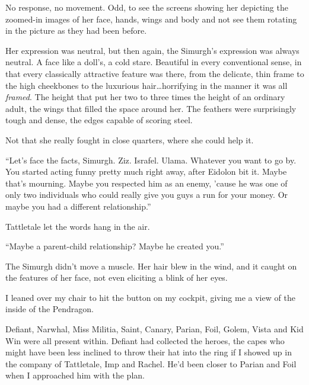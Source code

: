 No response, no movement.  Odd, to see the screens showing her depicting the zoomed-in images of her face, hands, wings and body and not see them rotating in the picture as they had been before.



Her expression was neutral, but then again, the Simurgh's expression was always neutral.  A face like a doll's, a cold stare.  Beautiful in every conventional sense, in that every classically attractive feature was there, from the delicate, thin frame to the high cheekbones to the luxurious hair\ldots horrifying in the manner it was all \emph{framed}.  The height that put her two to three times the height of an ordinary adult, the wings that filled the space around her.  The feathers were surprisingly tough and dense, the edges capable of scoring steel.



Not that she really fought in close quarters, where she could help it.



``Let's face the facts, Simurgh.  Ziz.  Israfel.  Ulama.  Whatever you want to go by.  You started acting funny pretty much right away, after Eidolon bit it.  Maybe that's mourning.  Maybe you respected him as an enemy, 'cause he was one of only two individuals who could really give you guys a run for your money.  Or maybe you had a different relationship.''



Tattletale let the words hang in the air.



``Maybe a parent-child relationship?  Maybe he created you.''



The Simurgh didn't move a muscle.  Her hair blew in the wind, and it caught on the features of her face, not even eliciting a blink of her eyes.



I leaned over my chair to hit the button on my cockpit, giving me a view of the inside of the Pendragon.



Defiant, Narwhal, Miss Militia, Saint, Canary, Parian, Foil, Golem, Vista and Kid Win were all present within.  Defiant had collected the heroes, the capes who might have been less inclined to throw their hat into the ring if I showed up in the company of Tattletale, Imp and Rachel.  He'd been closer to Parian and Foil when I approached him with the plan.



